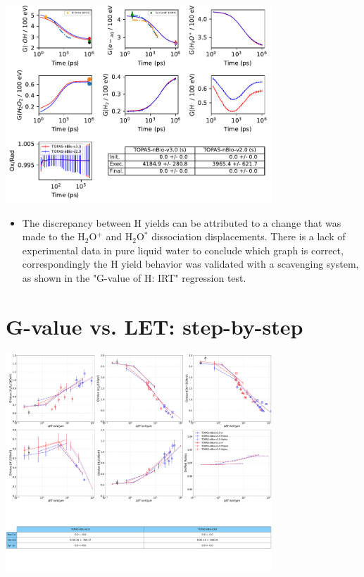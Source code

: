 \documentclass[aspectratio=1610]{beamer}
\begin{document}
\begin{frame}{\secname}
 \centering
   \includegraphics[width=0.75\textwidth]{./GvalueStepByStep/Gvalue}
\begin{itemize}
\item \tiny{The discrepancy between H yields can be attributed to a change that was made to the H$_2$O$^+$ and H$_2$O$^\ast$ dissociation displacements. There is a lack of experimental data in pure liquid water to conclude which graph is correct, correspondingly the H yield behavior was validated with a scavenging system, as shown in the "G-value of H: IRT" regression test.}
\end{itemize}
\end{frame}

\section{G-value vs. LET: step-by-step}

\begin{frame}{\secname}
 \centering
   \includegraphics[width=0.75\textwidth]{./Gvalue_LET-SBS/Gvalue_LET-SBS}
\end{frame}
\end{document}
